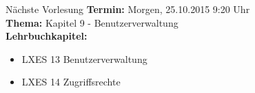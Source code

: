 \documentclass[aspectratio=43]{beamer}
\begin{document}
\begin{frame}[plain]
  \begin{alertblock}{Nächste Vorlesung}
    \textbf{Termin:} Morgen, 25.10.2015 9:20 Uhr\\
    \textbf{Thema:} Kapitel 9 - Benutzerverwaltung \\
    \textbf{Lehrbuchkapitel:} 
    \begin{itemize}
      \item LXES 13 Benutzerverwaltung
      \item LXES 14 Zugriffsrechte
    \end{itemize}
  \end{alertblock}
\end{frame}



\materialframe
\end{document}
